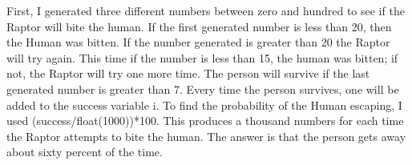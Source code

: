 \documentclass[twocolumn]{revtex4}
\begin{document}
First, I generated three different numbers between zero and hundred to see if the Raptor will bite 
    the human. If the first generated number is less than 20, then the Human was bitten. If the number
    generated is greater than 20 the Raptor will try again. This time if the number is less than 15, the 
    human was bitten; if not, the Raptor will try one more time. The person will survive if the last 
    generated number is greater than 7. Every time the person survives, one will be added to the success
    variable i. To find the probability of the Human escaping, I used (success/float(1000))*100. This 
    produces a thousand numbers for each time the Raptor attempts to bite the human. The answer is that 
    the person gets away about sixty percent of the time. 




\end{document}
